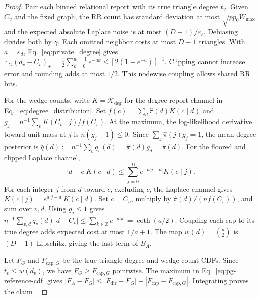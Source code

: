 \begin{proof}
Pair each binned relational report with its true triangle degree $t_v$. Given $C_v$ and the fixed graph, the RR count has standard deviation at most $\sqrt{pp_0W_{\max}}$ and the expected absolute Laplace noise is at most $(D-1)/\varepsilon_\ell$. Debiasing divides both by $\gamma$.
Each omitted neighbor costs at most $D-1$ triangles. With $a=\varepsilon_d$, Eq.~\eqref{eq:private_degree} gives $\mathbb E_G(d_v-C_v)_+=\tfrac12\sum_{k=0}^{d_v-1}e^{-ak}\leq[2(1-e^{-a})]^{-1}$.
Clipping cannot increase error and rounding adds at most $1/2$. This nodewise coupling allows shared RR bits.

For the wedge counts, write $K=\mathcal K_{\mathrm{deg}}$ for the degree-report channel in Eq.~\eqref{eq:degree_distribution}. Set $f(c)=\sum_d\widehat\pi(d)K(c\mid d)$ and $g_j=n^{-1}\sum_v K(C_v\mid j)/f(C_v)$.
At the maximum, the log-likelihood derivative toward unit mass at $j$ is $n(g_j-1)\leq0$. Since $\sum_j\widehat\pi(j)g_j=1$, the mean degree posterior is $\bar q(d):=n^{-1}\sum_v q_v(d)=\widehat\pi(d)g_d=\widehat\pi(d)$.
For the floored and clipped Laplace channel,
\[
 |d-c|K(c\mid d)\leq\sum_{j=0}^D e^{-a|j-d|}K(c\mid j).
\]
For each integer $j$ from $d$ toward $c$, excluding $c$, the Laplace channel gives $K(c\mid j)=e^{a|j-d|}K(c\mid d)$.
Set $c=C_v$, multiply by $\widehat\pi(d)/(n f(C_v))$, and sum over $v,d$.
Using $g_j\leq1$ gives $n^{-1}\sum_{v,d}q_v(d)|d-C_v|\leq\sum_{k\in\mathbb Z} e^{-a|k|}=\coth(a/2)$.
Coupling each cap to its true degree adds expected cost at most $1/a+1$. The map $w(d)=\binom d2$ is $(D-1)$-Lipschitz, giving the last term of $B_A$.

Let $F_G$ and $F_{\mathrm{cap},G}$ be the true triangle-degree and wedge-count CDFs. Since $t_v\leq w(d_v)$, we have $F_G\geq F_{\mathrm{cap},G}$ pointwise.
The maximum in Eq.~\eqref{eq:pg-reference-cdf} gives
$|F_A-F_G|\leq|F_{\mathrm{dir}}-F_G|+|F_{\mathrm{cap}}-F_{\mathrm{cap},G}|$.
Integrating proves the claim~\cite{vallender1974distance}.
\end{proof}

